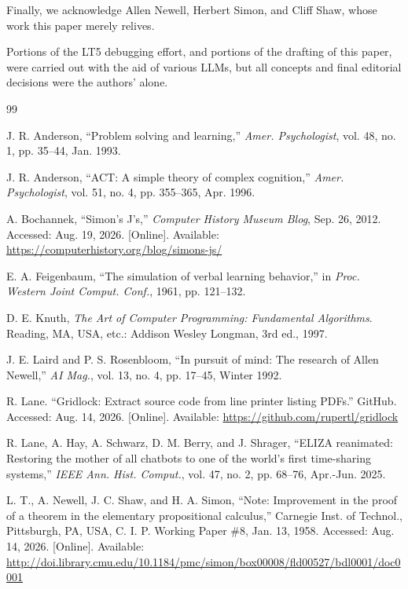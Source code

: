 \documentclass[journal]{IEEEtran}
\begin{document}
Finally, we acknowledge Allen Newell, Herbert Simon, and Cliff Shaw,
whose work this paper merely relives. 

{\footnotesize Portions of the LT5 debugging effort, and portions of
the drafting of this paper, were carried out with the aid of various
LLMs, but all concepts and final editorial decisions were the
authors' alone.}

\begin{thebibliography}{99}

 J. R. Anderson, ``Problem solving and learning,''
  \textit{Amer. Psychologist}, vol. 48, no. 1, pp. 35--44, Jan. 1993.

 J. R. Anderson, ``ACT: A simple theory of
  complex cognition,'' \textit{Amer. Psychologist}, vol. 51, no. 4,
  pp. 355--365, Apr. 1996.

 A. Bochannek, ``Simon's J's,''
  \textit{Computer History Museum Blog}, Sep. 26, 2012.
  Accessed: Aug. 19, 2026.  [Online].
  Available: \url{https://computerhistory.org/blog/simons-js/}

 E. A. Feigenbaum, ``The simulation of
  verbal learning behavior,'' in \textit{Proc. Western Joint
  Comput. Conf.}, 1961, pp. 121--132.

 D. E. Knuth,
  \textit{The Art of Computer Programming: Fundamental Algorithms}.
  Reading, MA, USA, etc.: Addison Wesley Longman, 3rd ed., 1997.

 J. E. Laird and P. S. Rosenbloom,
  ``In pursuit of mind: The research of Allen Newell,''
  \textit{AI Mag.}, vol. 13, no. 4, pp. 17--45, Winter 1992.

 R. Lane. ``Gridlock: Extract
  source code from line printer listing PDFs.'' GitHub.
  Accessed: Aug. 14, 2026.  [Online].
  Available: \url{https://github.com/rupertl/gridlock}

 R. Lane, A. Hay, A. Schwarz, D. M. Berry, and
  J. Shrager, ``ELIZA reanimated: Restoring the mother of all chatbots
  to one of the world's first time-sharing systems,'' \textit{IEEE
  Ann. Hist. Comput.}, vol. 47, no. 2, pp. 68--76, Apr.-Jun. 2025.

 L. T., A. Newell, J. C. Shaw, and H. A. Simon,
  ``Note: Improvement in the proof of a theorem in the elementary
  propositional calculus,''
  Carnegie Inst. of Technol., Pittsburgh, PA, USA,
  C. I. P. Working Paper \#8, Jan. 13, 1958.
  Accessed: Aug. 14, 2026.  [Online].
  Available: \url{http://doi.library.cmu.edu/10.1184/pmc/simon/box00008/fld00527/bdl0001/doc0001}


\end{thebibliography}
\end{document}

